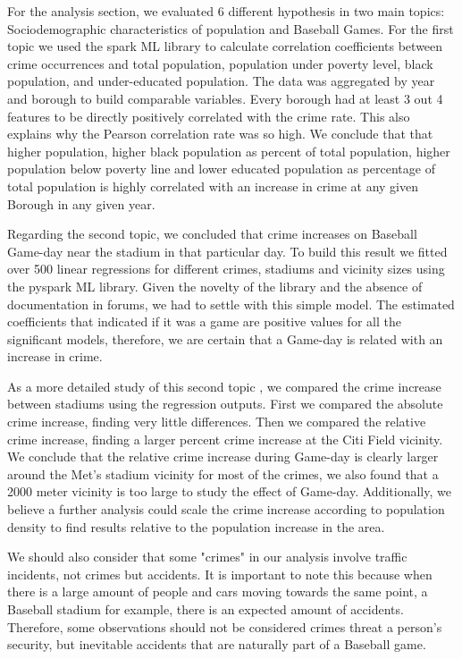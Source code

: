 \documentclass{article}
\begin{document}
For the analysis section, we evaluated 6 different hypothesis in two main topics: Sociodemographic characteristics of population and Baseball Games. For the first topic we used the spark ML library to calculate correlation coefficients between crime occurrences and total population, population under poverty level, black population, and under-educated population. The data was aggregated by year and borough to build comparable variables. Every borough had at least 3 out 4 features to be directly positively correlated with the crime rate. This also explains why the Pearson correlation rate was so high. We conclude that that higher population, higher black population as percent of total population, higher population below poverty line and lower educated population as percentage of total population is highly correlated with an increase in crime at any given Borough in any given year.  

Regarding the second topic, we concluded that crime increases on Baseball Game-day near the stadium in that particular day. To build this result we fitted over 500 linear regressions for different crimes, stadiums and vicinity sizes using the pyspark ML library. Given the novelty of the library and the absence of documentation in forums, we had to settle with this simple model. The estimated coefficients that indicated if it was a game are positive values for all the significant models, therefore, we are certain that a Game-day is related with an increase in crime. 

As a more detailed study of this second topic , we compared the crime increase between stadiums using the regression outputs. First we compared the absolute crime increase, finding very little differences. Then we compared the relative crime increase, finding a larger percent crime increase at the Citi Field vicinity. We conclude that the relative crime increase during Game-day is clearly larger around the Met's stadium vicinity for most of the crimes, we also  found that a 2000 meter vicinity is too large to study the effect of Game-day. Additionally, we believe a further analysis could scale the crime increase according to population density to find results relative to the population increase in the area. 

We should also consider that some "crimes" in our analysis involve traffic incidents, not crimes but accidents. It is important to note this because when there is a large amount of people and cars moving towards the same point, a Baseball stadium for example, there is an expected amount of accidents. Therefore, some observations should not be considered crimes threat a person's security, but inevitable accidents that are naturally part of a Baseball game. 
\end{document}
